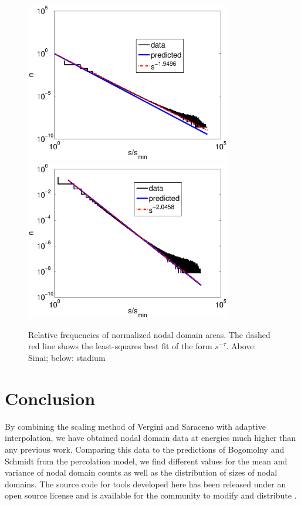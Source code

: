 \documentclass{report}
\begin{document}
\begin{figure}
  \begin{center}
    \includegraphics[width=0.8\textwidth]{figs/results/qugrs_all_sizes.eps}
    \includegraphics[width=0.8\textwidth]{figs/results/qust_700_to_900_sizes_0.1_sampled.eps}
    \caption{Relative frequencies of normalized nodal domain areas. The dashed red line shows the least-squares best fit of the form $s^{-\tau}$. Above: Sinai; below: stadium}
    \label{fig:area}
  \end{center}
\end{figure}

\chapter{Conclusion}
By combining the scaling method of Vergini and Saraceno \cite{vergini} with adaptive interpolation, we have obtained nodal domain data at energies much higher than any previous work. Comparing this data to the predictions of Bogomolny and Schmidt \cite{bogomolny} from the percolation model, we find different values for the mean and variance of nodal domain counts as well as the distribution of sizes of nodal domains. The source code for tools developed here has been released under an open source license \cite{gpl} and is available for the community to modify and distribute \cite{github}.
\end{document}

